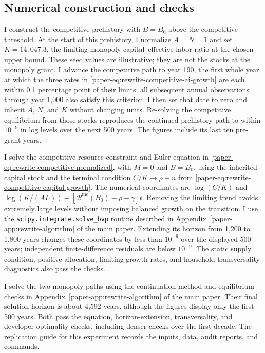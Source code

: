 \subsection{Numerical construction and checks}
\label{app:rewrite-growth-reversal-numerics}

I construct the competitive prehistory with $B=B_0$ above the competitive
threshold. At the start of this prehistory, I normalize $A=N=1$ and
set $K=14{,}047.3$, the limiting monopoly capital--effective-labor ratio
at the chosen upper bound. These seed values are illustrative; they
are not the stocks at the monopoly grant. I advance the competitive
path to year 190, the first whole year at which the three rates in
\eqref{paper-eq:rewrite-competitive-ai-growth} are each within 0.1 percentage
point of their limits; all subsequent annual observations through
year 1,000 also satisfy this criterion. I then set that date to zero
and inherit $A$, $N$, and $K$ without changing units. Re-solving the
competitive equilibrium from those stocks reproduces the continued
prehistory path to within $10^{-9}$ in log levels over the next 500
years. The figures include its last ten pre-grant years.

I solve the competitive resource constraint and Euler equation in
\eqref{paper-eq:rewrite-competitive-normalized}, with $M=0$ and $B=B_0$,
using the inherited capital stock and the terminal condition
$C/K\to\rho-n$ from \eqref{paper-eq:rewrite-competitive-capital-growth}.
The numerical coordinates are $\log(C/K)$ and
$\log(K/(AL))-[\mathcal R^{\mathrm{mc}}(B_0)-\rho-\gamma]t$.
Removing the limiting trend avoids extremely large levels without
imposing balanced growth on the transition. I use the
\texttt{scipy.integrate.solve\_bvp} routine described in
Appendix~\ref{paper-app:rewrite-algorithm} of the main paper.
Extending its horizon from 1,200 to 1,800 years changes these coordinates
by less than $10^{-9}$ over the displayed 500 years; independent
finite-difference residuals are below $10^{-9}$.
The static supply condition, positive allocation, limiting growth
rates, and household transversality diagnostics also pass the checks.

I solve the two monopoly paths using the continuation method and
equilibrium checks in Appendix~\ref{paper-app:rewrite-algorithm} of the
main paper. Their final solution horizon is about 4,592 years, although
the figures display only the first 500 years. Both pass the equation,
horizon-extension, transversality, and developer-optimality checks,
including denser checks over the first decade. The
\href{https://github.com/oliverpardo1979/ai-growth-and-labor/blob/main/MONOPOLY_GROWTH_REVERSAL.md}{replication guide for this experiment}
records the inputs, data, audit reports, and commands.
